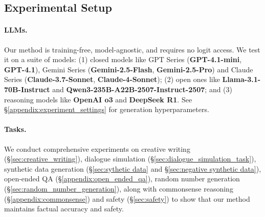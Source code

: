 \subsection{Experimental Setup} \label{sec:experimental_setup}
\paragraph{LLMs.} 

Our method is training-free, model-agnostic, and requires no logit access. We test it on a suite of models: (1) closed models like {GPT Series} (\textbf{GPT-4.1-mini}, \textbf{GPT-4.1}), {Gemini Series} (\textbf{Gemini-2.5-Flash}, \textbf{Gemini-2.5-Pro}) and {Claude Series} (\textbf{Claude-3.7-Sonnet}, \textbf{Claude-4-Sonnet}); (2) open ones like \textbf{Llama-3.1-70B-Instruct} and \textbf{Qwen3-235B-A22B-2507-Instruct-2507}; and (3) {reasoning models} like \textbf{OpenAI o3} and \textbf{DeepSeek R1}. See  \S\ref{appendix:experiment_settings} for generation  hyperparameters.





\paragraph{Tasks.} We conduct comprehensive experiments on creative writing (\S\ref{sec:creative_writing}), dialogue simulation (\S\ref{sec:dialogue_simulation_task}), synthetic data generation (\S\ref{sec:sythetic data} and \S\ref{sec:negative synthetic data}), open-ended QA (\S\ref{appendix:open_ended_qa}), random number generation (\S\ref{sec:random_number_generation}), along with commonsense reasoning (\S\ref{appendix:commonsense}) and safety (\S\ref{sec:safety}) to show that our method maintains factual accuracy and safety.


